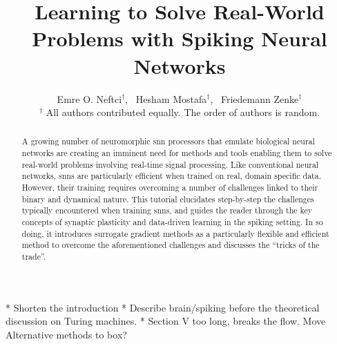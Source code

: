 \documentclass[journal,onecolumn,11pt]{IEEEtran}
\begin{document}
\title{Learning to Solve Real-World Problems with Spiking Neural Networks}

\author{Emre O. Neftci$^\dagger$,~
        Hesham Mostafa$^\dagger$,~
        Friedemann Zenke$^\dagger$\\
        {\small $^\dagger$ All authors contributed equally. The order of authors is random.}}%
%
{}
%
\maketitle
\IEEEpeerreviewmaketitle
%
\begin{abstract}
A growing number of neuromorphic \gls{snn} processors that emulate biological neural networks are creating an imminent need for methods and tools enabling them to solve real-world problems involving real-time signal processing.
Like conventional neural networks, \glspl{snn} are particularly efficient when trained on real, domain specific data. 
However, their training requires overcoming a number of challenges linked to their binary and dynamical nature.
This tutorial elucidates step-by-step the challenges typically encountered when training \glspl{snn}, and guides the reader through the key concepts of synaptic plasticity and data-driven learning in the spiking setting.
In so doing, it introduces surrogate gradient methods as a particularly flexible and efficient method to overcome the aforementioned challenges and discusses the ``tricks of the trade''. 
\end{abstract}


\tableofcontents
\newpage


\begin{center}
  * Shorten the introduction
  * Describe brain/spiking before the theoretical discussion on Turing machines.
  * Section V too long, breaks the flow. Move Alternative methods to box?
\end{center}
\end{document}
